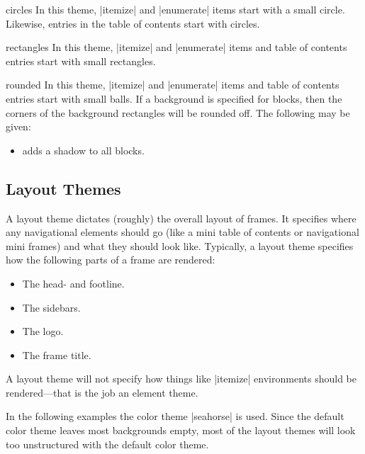 \begin{elementthemeexample}{circles}
  In this theme, |itemize| and |enumerate| items start with a small
  circle. Likewise, entries in the table of contents start with
  circles. 
\end{elementthemeexample}

\begin{elementthemeexample}{rectangles}
  In this theme, |itemize| and |enumerate| items and table of contents
  entries  start with small rectangles. 
\end{elementthemeexample}

\begin{elementthemeexample}{rounded}
  In this theme, |itemize| and |enumerate| items and table of contents
  entries start with small balls. If a background is specified for
  blocks, then the corners of the background rectangles will be
  rounded off. The following  may be given:

  \begin{itemize}
  \item {} adds a shadow to all blocks.
  \end{itemize}
\end{elementthemeexample}




\subsection{Layout Themes}

A layout theme dictates (roughly) the overall layout of frames. It
specifies where any navigational elements should go (like a mini table
of contents or navigational mini frames) and what they should look
like. Typically, a layout theme specifies how the following parts of a
frame are rendered:
\begin{itemize}
\item The head- and footline.
\item The sidebars.
\item The logo.
\item The frame title.  
\end{itemize}

A layout theme will not specify how things like |itemize| environments
should be rendered---that is the job an element theme.

In the following examples the color theme |seahorse| is
used. Since the default color theme leaves most backgrounds empty,
most of the layout themes will look too unstructured with the default
color theme. 


